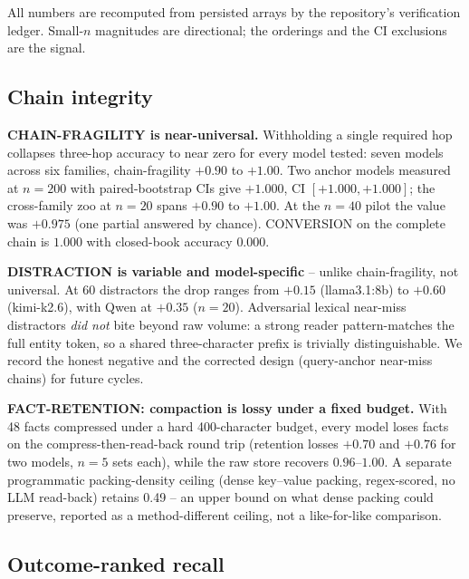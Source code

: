 \documentclass[11pt]{article}
\begin{document}
All numbers are recomputed from persisted arrays by the repository's verification ledger. Small-$n$
magnitudes are directional; the orderings and the CI exclusions are the signal.

\subsection{Chain integrity}

\textbf{CHAIN-FRAGILITY is near-universal.} Withholding a single required hop collapses three-hop
accuracy to near zero for every model tested: seven models across six families, chain-fragility
$+0.90$ to $+1.00$. Two anchor models measured at $n{=}200$ with paired-bootstrap CIs give $+1.000$,
CI $[+1.000,+1.000]$; the cross-family zoo at $n{=}20$ spans $+0.90$ to $+1.00$. At the $n{=}40$ pilot
the value was $+0.975$ (one partial answered by chance). CONVERSION on the complete chain is $1.000$
with closed-book accuracy $0.000$.

\textbf{DISTRACTION is variable and model-specific} -- unlike chain-fragility, not universal. At 60
distractors the drop ranges from $+0.15$ (llama3.1:8b) to $+0.60$ (kimi-k2.6), with Qwen at $+0.35$
($n{=}20$). Adversarial lexical near-miss distractors \emph{did not} bite beyond raw volume: a strong
reader pattern-matches the full entity token, so a shared three-character prefix is trivially
distinguishable. We record the honest negative and the corrected design (query-anchor near-miss chains)
for future cycles.

\textbf{FACT-RETENTION: compaction is lossy under a fixed budget.} With 48 facts compressed under a hard
400-character budget, every model loses facts on the compress-then-read-back round trip (retention
losses $+0.70$ and $+0.76$ for two models, $n{=}5$ sets each), while the raw store recovers
$0.96$--$1.00$. A separate programmatic packing-density ceiling (dense key--value packing, regex-scored,
no LLM read-back) retains 0.49 -- an upper bound on what dense packing could preserve, reported as a
method-different ceiling, not a like-for-like comparison.

\subsection{Outcome-ranked recall}
\end{document}

